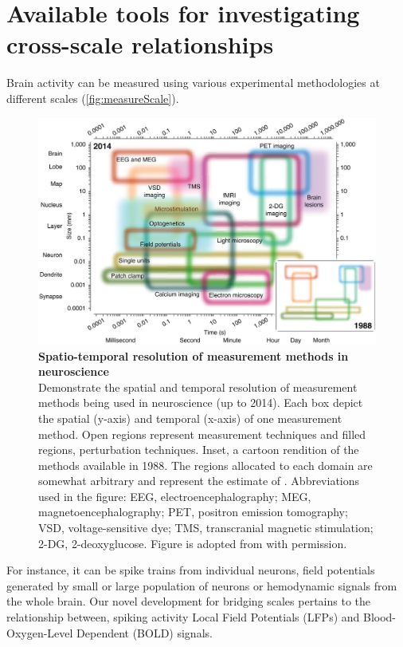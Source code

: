 \section{Available tools for investigating cross-scale relationships}\label{sec:avail-tools-invest}
Brain activity can be measured using various experimental methodologies at different scales
(\autoref{fig:measureScale}).
\begin{figure}[h]
  \centering
  \includegraphics[width = \linewidth]{gfx/sejnowski2014pbd_fig1.jpg}
  \caption{\textbf{Spatio-temporal resolution of measurement methods in neuroscience}\\
    Demonstrate the spatial and temporal resolution of measurement methods being used in neuroscience
    (up to 2014).
    Each box depict the spatial (y-axis) and temporal (x-axis) of one measurement method.
    Open regions represent measurement techniques and 
    filled regions, perturbation techniques.
    Inset, a cartoon rendition of the methods available in 1988.
    The regions allocated to each domain are somewhat arbitrary and represent the estimate of \citet{sejnowskiPuttingBigData2014}.
    Abbreviations used in the figure:
    EEG, electroencephalography;
    MEG, magnetoencephalography;
    PET, positron emission tomography;
    VSD, voltage-sensitive dye;
    TMS, transcranial magnetic stimulation; 
    2-DG, 2-deoxyglucose.
    Figure is adopted from \citet{sejnowskiPuttingBigData2014} with permission.}
  \label{fig:measureScale}
\end{figure}
For instance, it can be spike trains from individual neurons, 
field potentials generated by small or large population of neurons or hemodynamic signals from the whole brain.
Our novel development for bridging scales pertains to the relationship between,
spiking activity
Local Field Potentials (LFPs) and 
Blood-Oxygen-Level Dependent (BOLD) signals.


